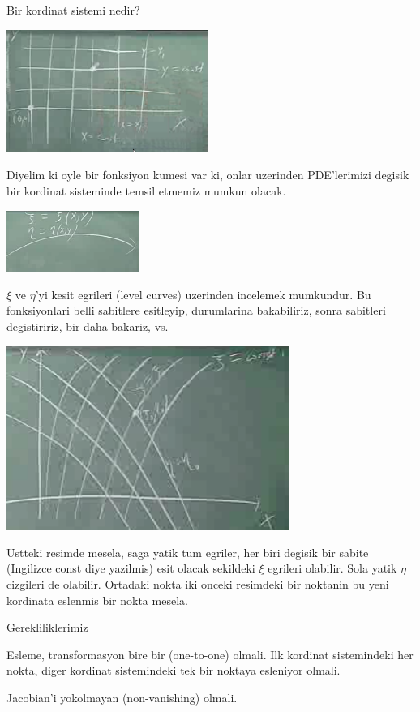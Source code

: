 \documentclass[12pt,fleqn]{article}\usepackage{../common}
\begin{document}
Bir kordinat sistemi nedir? 

\includegraphics[height=4cm]{1_12.png}

Diyelim ki oyle bir fonksiyon kumesi var ki, onlar uzerinden PDE'lerimizi
degisik bir kordinat sisteminde temsil etmemiz mumkun olacak. 

\includegraphics[height=2cm]{1_13.png}

$\xi$ ve $\eta$'yi kesit egrileri (level curves) uzerinden incelemek
mumkundur. Bu fonksiyonlari belli sabitlere esitleyip, durumlarina
bakabiliriz, sonra sabitleri degistiririz, bir daha bakariz, vs. 

\includegraphics[height=6cm]{1_14.png}

Ustteki resimde mesela, saga yatik tum egriler, her biri degisik bir sabite
(Ingilizce const diye yazilmis) esit olacak sekildeki $\xi$ egrileri
olabilir. Sola yatik $\eta$ cizgileri de olabilir. Ortadaki nokta iki
onceki resimdeki bir noktanin bu yeni kordinata eslenmis bir nokta mesela.

Gerekliliklerimiz

Esleme, transformasyon bire bir (one-to-one) olmali. Ilk kordinat
sistemindeki her nokta, diger kordinat sistemindeki tek bir noktaya
esleniyor olmali. 

Jacobian'i yokolmayan (non-vanishing) olmali. 
\end{document}
